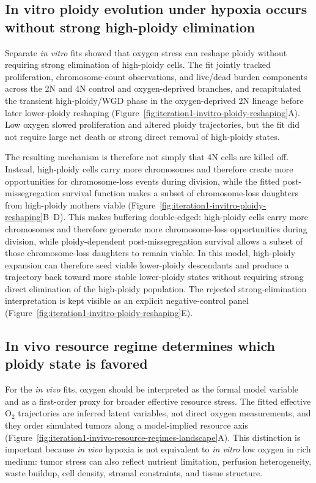 \documentclass[11pt]{article}
\begin{document}
\subsection*{In vitro ploidy evolution under hypoxia occurs without strong high-ploidy elimination}

Separate \textit{in vitro} fits showed that oxygen stress can reshape ploidy without requiring strong elimination of high-ploidy cells. The fit jointly tracked proliferation, chromosome-count observations, and live/dead burden components across the 2N and 4N control and oxygen-deprived branches, and recapitulated the transient high-ploidy/WGD phase in the oxygen-deprived 2N lineage before later lower-ploidy reshaping (Figure~\ref{fig:iteration1-invitro-ploidy-reshaping}A). Low oxygen slowed proliferation and altered ploidy trajectories, but the fit did not require large net death or strong direct removal of high-ploidy states.

The resulting mechanism is therefore not simply that 4N cells are killed off. Instead, high-ploidy cells carry more chromosomes and therefore create more opportunities for chromosome-loss events during division, while the fitted post-missegregation survival function makes a subset of chromosome-loss daughters from high-ploidy mothers viable (Figure~\ref{fig:iteration1-invitro-ploidy-reshaping}B--D). This makes buffering double-edged: high-ploidy cells carry more chromosomes and therefore generate more chromosome-loss opportunities during division, while ploidy-dependent post-missegregation survival allows a subset of those chromosome-loss daughters to remain viable. In this model, high-ploidy expansion can therefore seed viable lower-ploidy descendants and produce a trajectory back toward more stable lower-ploidy states without requiring strong direct elimination of the high-ploidy population. The rejected strong-elimination interpretation is kept visible as an explicit negative-control panel (Figure~\ref{fig:iteration1-invitro-ploidy-reshaping}E).

\subsection*{In vivo resource regime determines which ploidy state is favored}

For the \textit{in vivo} fits, oxygen should be interpreted as the formal model variable and as a first-order proxy for broader effective resource stress. The fitted effective O$_2$ trajectories are inferred latent variables, not direct oxygen measurements, and they order simulated tumors along a model-implied resource axis (Figure~\ref{fig:iteration1-invivo-resource-regimes-landscape}A). This distinction is important because \textit{in vivo} hypoxia is not equivalent to \textit{in vitro} low oxygen in rich medium: tumor stress can also reflect nutrient limitation, perfusion heterogeneity, waste buildup, cell density, stromal constraints, and tissue structure.
\end{document}
